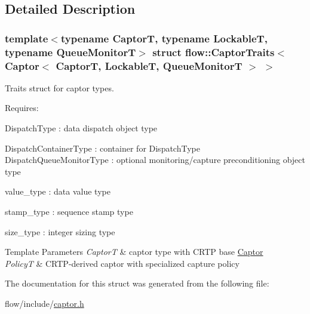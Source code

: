 \subsection{Detailed Description}
\subsubsection*{template$<$typename CaptorT, typename LockableT, typename Queue\+MonitorT$>$\newline
struct flow\+::\+Captor\+Traits$<$ Captor$<$ Captor\+T, Lockable\+T, Queue\+Monitor\+T $>$ $>$}

Traits struct for captor types. 

Requires\+:
\begin{DoxyItemize}
\item {\ttfamily Dispatch\+Type} \+: data dispatch object type
\item {\ttfamily Dispatch\+Container\+Type} \+: container for {\ttfamily Dispatch\+Type} {\ttfamily Dispatch\+Queue\+Monitor\+Type} \+: optional monitoring/capture preconditioning object type
\item {\ttfamily value\+\_\+type} \+: data value type
\item {\ttfamily stamp\+\_\+type} \+: sequence stamp type
\item {\ttfamily size\+\_\+type} \+: integer sizing type
\end{DoxyItemize}


\begin{DoxyTemplParams}{Template Parameters}
{\em CaptorT} & captor type with C\+R\+TP base {\ttfamily \hyperlink{classflow_1_1_captor}{Captor}}\\
\hline
{\em PolicyT} & C\+R\+T\+P-\/derived captor with specialized capture policy \\
\hline
\end{DoxyTemplParams}


The documentation for this struct was generated from the following file\+:\begin{DoxyCompactItemize}
\item 
flow/include/\hyperlink{captor_8h}{captor.\+h}\end{DoxyCompactItemize}
